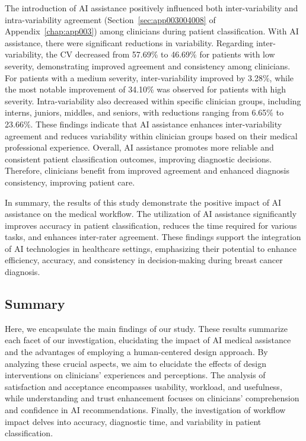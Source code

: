The introduction of \ac{AI} assistance positively influenced both inter-variability and intra-variability agreement (Section~\ref{sec:app003004008} of Appendix~\ref{chap:app003}) among clinicians during patient classification.
With \ac{AI} assistance, there were significant reductions in variability.
Regarding inter-variability, the \ac{CV} decreased from 57.69\% to 46.69\% for patients with low severity, demonstrating improved agreement and consistency among clinicians.
For patients with a medium severity, inter-variability improved by 3.28\%, while the most notable improvement of 34.10\% was observed for patients with high severity.
Intra-variability also decreased within specific clinician groups, including interns, juniors, middles, and seniors, with reductions ranging from 6.65\% to 23.66\%.
These findings indicate that \ac{AI} assistance enhances inter-variability agreement and reduces variability within clinician groups based on their medical professional experience.
Overall, \ac{AI} assistance promotes more reliable and consistent patient classification outcomes, improving diagnostic decisions.
Therefore, clinicians benefit from improved agreement and enhanced diagnosis consistency, improving patient care.

In summary, the results of this study demonstrate the positive impact of \ac{AI} assistance on the medical workflow.
The utilization of \ac{AI} assistance significantly improves accuracy in patient classification, reduces the time required for various tasks, and enhances inter-rater agreement.
These findings support the integration of \ac{AI} technologies in healthcare settings, emphasizing their potential to enhance efficiency, accuracy, and consistency in decision-making during breast cancer diagnosis.

\subsection{Summary}
\label{sec:chap005006004}

Here, we encapsulate the main findings of our study.
These results summarize each facet of our investigation, elucidating the impact of \ac{AI} medical assistance and the advantages of employing a human-centered design approach.
By analyzing these crucial aspects, we aim to elucidate the effects of design interventions on clinicians' experiences and perceptions.
The analysis of satisfaction and acceptance encompasses usability, workload, and usefulness, while understanding and trust enhancement focuses on clinicians' comprehension and confidence in \ac{AI} recommendations.
Finally, the investigation of workflow impact delves into accuracy, diagnostic time, and variability in patient classification.


